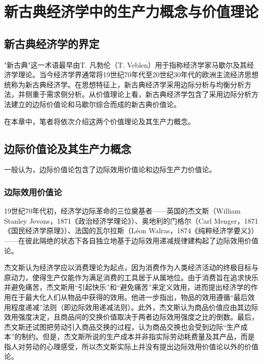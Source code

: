 
\chapter{新古典经济学中的生产力概念与价值理论}

\section{新古典经济学的界定}

"新古典"这一术语最早由T. 凡勃伦（T. Veblen）用于指称经济学家马歇尔及其经济学理论\cite[9382]{macmillanpublishersltdNewPalgraveDictionary2018}。当今经济学界通常将19世纪70年代至20世纪30年代的欧洲主流经济思想统称为新古典经济学\cite[241]{YanZhiJieXiFangJingJiXueShuoShiJiaoChengDiErBan2013}。在思想特征上，新古典经济学采用边际分析与均衡分析方法，并侧重于需求侧分析。从价值理论上看，新古典经济学包含了采用边际分析方法建立的边际价值论和马歇尔综合而成的新古典价值论\cite[181-184]{CaiJiMingCongGuDianZhengZhiJingJiXueDaoZhongGuoTeSeSheHuiZhuYiZhengZhiJingJiXueJiYuZhongGuoShiJiaoDeZhengZhiJingJiXueYanBianShangCe2023}。

在本章中，笔者将依次介绍这两个价值理论及其生产力概念。

\section{边际价值论及其生产力概念}

一般认为，边际价值论包含了边际效用价值论和边际生产力价值论\cite[181]{CaiJiMingCongGuDianZhengZhiJingJiXueDaoZhongGuoTeSeSheHuiZhuYiZhengZhiJingJiXueJiYuZhongGuoShiJiaoDeZhengZhiJingJiXueYanBianShangCe2023}。

\subsection{边际效用价值论}

19世纪70年代初，经济学边际革命的三位奠基者——英国的杰文斯（William Stanley Jevons，1871《政治经济学理论》）、奥地利的门格尔（Carl Menger，1871《国民经济学原理》）、法国的瓦尔拉斯（Léon Walras，1874《纯粹经济学要义》）——在彼此隔绝的状态下各自独立地基于边际效用递减规律建构起了边际效用价值论\cite[iii]{r.d.c.BuLaiKeJingJiXueDeBianJiGeMingShuoMingHePingJie2020}\cite[242]{YanZhiJieXiFangJingJiXueShuoShiJiaoChengDiErBan2013}。

杰文斯认为经济学应以消费理论为起点，因为消费作为人类经济活动的终极目标与原动力，使得生产仅能作为满足消费的工具居于从属地位。由于消费旨在追求快乐并避免痛苦，杰文斯用“引起快乐”和“避免痛苦”来定义效用，进而提出经济学的作用在于最大化人们从物品中获得的效用。他进一步指出，物品的效用遵循“最后效用程度递减”法则（即边际效用递减法则）。此外，杰文斯认为商品价值应由其边际效用强度决定，且商品间的交换价值取决于两者边际效用强度之比的倒数。最后，杰文斯还试图把劳动引入商品交换的过程，认为商品交换也会受到边际“生产成本”的制约。但是，杰文斯所说的生产成本并非指实际劳动耗费量及其产品，而是指人对劳动的心理感受，所以杰文斯实际上并没有提出边际效用价值论以外的价值论。\cite[125-136，142-149]{YanZhiJieCongBianJiGeMingDaoKaiEnSiGeMing2022}\cite[52-131]{SiTanLi*JieWenSiZhengZhiJingJiXueLiLun1984}


